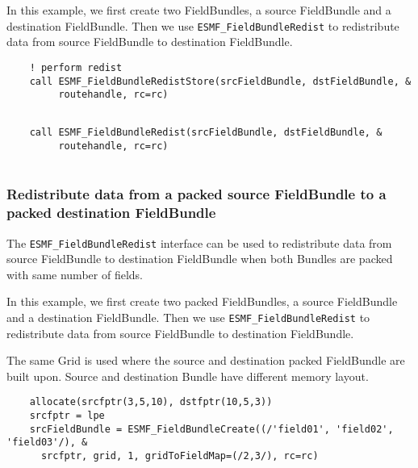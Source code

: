   In this example, we first create two FieldBundles, a source FieldBundle and a destination
   FieldBundle. Then we use {\tt ESMF\_FieldBundleRedist} to
   redistribute data from source FieldBundle to destination FieldBundle. 

 \begin{verbatim}
    ! perform redist
    call ESMF_FieldBundleRedistStore(srcFieldBundle, dstFieldBundle, &
         routehandle, rc=rc)
 
\end{verbatim}
 

 \begin{verbatim}
    call ESMF_FieldBundleRedist(srcFieldBundle, dstFieldBundle, &
         routehandle, rc=rc)
 
\end{verbatim}
 

   \subsubsection{Redistribute data from a packed source FieldBundle to a packed destination FieldBundle}
   \label{sec:fieldbundle:usage:redist_packed}
  
   The {\tt ESMF\_FieldBundleRedist} interface can be used to redistribute data from
   source FieldBundle to destination FieldBundle when both Bundles are packed with same
   number of fields.  
  
   In this example, we first create two packed FieldBundles, a source FieldBundle and a destination
   FieldBundle. Then we use {\tt ESMF\_FieldBundleRedist} to
   redistribute data from source FieldBundle to destination FieldBundle.
  
   The same Grid is used where the source and destination packed FieldBundle are built upon. Source
   and destination Bundle have different memory layout. 

 \begin{verbatim}
    allocate(srcfptr(3,5,10), dstfptr(10,5,3))
    srcfptr = lpe
    srcFieldBundle = ESMF_FieldBundleCreate((/'field01', 'field02', 'field03'/), &
      srcfptr, grid, 1, gridToFieldMap=(/2,3/), rc=rc)
 
\end{verbatim}
 
